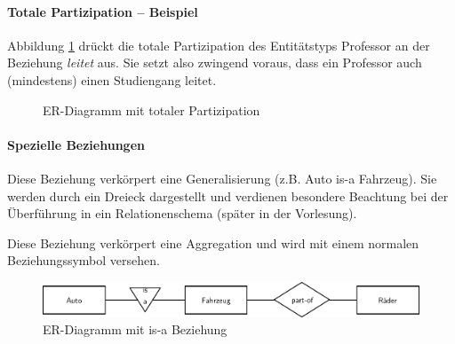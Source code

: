 \begin{frame}{\insertsection}
\framesubtitle{Totale Partizipation -- Beispiel}
Abbildung \ref{er:total} dr\"uckt die totale Partizipation des Entit\"atstyps Professor an der Beziehung \emph{leitet} aus. 
Sie setzt also zwingend voraus, dass ein Professor auch (mindestens) einen Studiengang leitet.  
\begin{figure}
\caption{\label{er:total}ER-Diagramm mit totaler Partizipation}
\end{figure}		
\end{frame}


\begin{frame}[label=isarelation]{\insertsection}
\framesubtitle{Spezielle Beziehungen}

\begin{description}[leftmargin=0cm]
\item[is-a] Diese Beziehung verkörpert eine Generalisierung (z.B. Auto is-a Fahrzeug). Sie werden durch 
ein Dreieck dargestellt und verdienen besondere Beachtung bei der Überführung in ein Relationenschema (später in der Vorlesung).
\item[part-of] Diese Beziehung verkörpert eine Aggregation und wird mit einem normalen Beziehungssymbol versehen.
\end{description}

\begin{figure}
\includegraphics[scale=0.8]{img/genagg.pdf}
\caption{ER-Diagramm mit is-a Beziehung}
\end{figure}
\end{frame}

